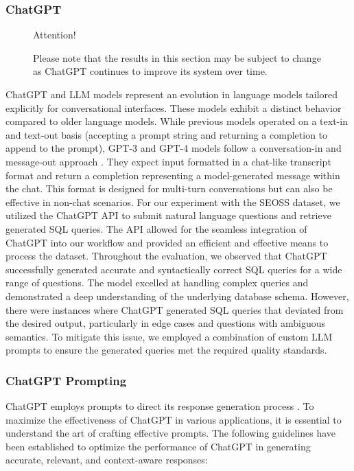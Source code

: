 \subsubsection{ChatGPT}

\begin{figure}[H]
    \begin{AIbox}{Attention!}
        \parbox{1\textwidth}{
            Please note that the results in this section may be subject to change as ChatGPT continues to improve its system over time.
        }
    \end{AIbox}
\end{figure}


ChatGPT and \ac{LLM} models represent an evolution in language models tailored explicitly for conversational interfaces. These models exhibit a distinct behavior compared to older language models. While previous models operated on a text-in and text-out basis (accepting a prompt string and returning a completion to append to the prompt), GPT-3 and GPT-4 models follow a conversation-in and message-out approach \cite{bubeck2023sparks}. They expect input formatted in a chat-like transcript format and return a completion representing a model-generated message within the chat. This format is designed for multi-turn conversations but can also be effective in non-chat scenarios.
For our experiment with the SEOSS dataset, we utilized the ChatGPT API to submit natural language questions and retrieve generated SQL queries. The API allowed for the seamless integration of ChatGPT into our workflow and provided an efficient and effective means to process the dataset.
Throughout the evaluation, we observed that ChatGPT successfully generated accurate and syntactically correct SQL queries for a wide range of questions. The model excelled at handling complex queries and demonstrated a deep understanding of the underlying database schema.
However, there were instances where ChatGPT generated SQL queries that deviated from the desired output, particularly in edge cases and questions with ambiguous semantics. To mitigate this issue, we employed a combination of custom LLM prompts to ensure the generated queries met the required quality standards.

\subsubsection{ChatGPT Prompting}


ChatGPT employs prompts to direct its response generation process \cite{white2023prompt}. 
To maximize the effectiveness of ChatGPT in various applications, it is essential to understand the art of crafting effective prompts. The following guidelines have been established to optimize the performance of ChatGPT in generating accurate, relevant, and context-aware responses:


